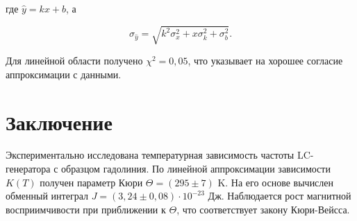 \documentclass[a4paper,12pt]{article}
\begin{document}
где $\hat{y} = kx + b$, а

\begin{equation*}
    \sigma_{\hat{y}} = \sqrt{ k^2 \sigma_x^2 + x \sigma_k^2 + \sigma_b^2 }.
\end{equation*}

Для линейной области получено $\chi^2 = 0{,}05$, что указывает на хорошее согласие аппроксимации с данными.

\section{Заключение}

Экспериментально исследована температурная зависимость частоты LC-генератора с образцом гадолиния. По линейной аппроксимации зависимости $K(T)$ получен параметр Кюри $\Theta = (295 \pm 7)$ K. На его основе вычислен обменный интеграл $J = (3{,}24 \pm 0{,}08)\cdot 10^{-23}$ Дж. Наблюдается рост магнитной восприимчивости при приближении к $\Theta$, что соответствует закону Кюри-Вейсса.
\end{document}
